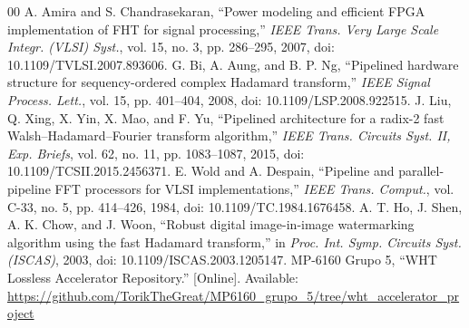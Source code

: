 \documentclass[conference]{IEEEtran}
\begin{document}
\begin{thebibliography}{00}
 A. Amira and S. Chandrasekaran, ``Power modeling and efficient FPGA implementation of FHT for signal processing,'' \emph{IEEE Trans. Very Large Scale Integr. (VLSI) Syst.}, vol. 15, no. 3, pp. 286--295, 2007, doi: 10.1109/TVLSI.2007.893606.
 G. Bi, A. Aung, and B. P. Ng, ``Pipelined hardware structure for sequency-ordered complex Hadamard transform,'' \emph{IEEE Signal Process. Lett.}, vol. 15, pp. 401--404, 2008, doi: 10.1109/LSP.2008.922515.
 J. Liu, Q. Xing, X. Yin, X. Mao, and F. Yu, ``Pipelined architecture for a radix-2 fast Walsh--Hadamard--Fourier transform algorithm,'' \emph{IEEE Trans. Circuits Syst. II, Exp. Briefs}, vol. 62, no. 11, pp. 1083--1087, 2015, doi: 10.1109/TCSII.2015.2456371.
 E. Wold and A. Despain, ``Pipeline and parallel-pipeline FFT processors for VLSI implementations,'' \emph{IEEE Trans. Comput.}, vol. C-33, no. 5, pp. 414--426, 1984, doi: 10.1109/TC.1984.1676458.
 A. T. Ho, J. Shen, A. K. Chow, and J. Woon, ``Robust digital image-in-image watermarking algorithm using the fast Hadamard transform,'' in \emph{Proc. Int. Symp. Circuits Syst. (ISCAS)}, 2003, doi: 10.1109/ISCAS.2003.1205147.
 MP-6160 Grupo 5, ``WHT Lossless Accelerator Repository.'' [Online]. Available: \url{https://github.com/TorikTheGreat/MP6160_grupo_5/tree/wht_accelerator_project}
\end{thebibliography}
\end{document}
